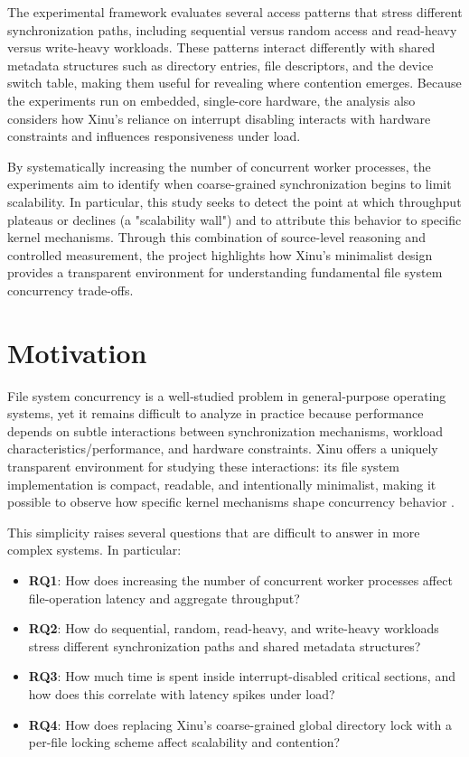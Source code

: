 \documentclass[sigconf]{acmart}
\begin{document}
The experimental framework evaluates several access patterns that stress different synchronization paths, including sequential versus random access and read-heavy versus write-heavy workloads. These patterns interact differently with shared metadata structures such as directory entries, file descriptors, and the device switch table, making them useful for revealing where contention emerges. Because the experiments run on embedded, single-core hardware, the analysis also considers how Xinu’s reliance on interrupt disabling interacts with hardware constraints and influences responsiveness under load.

By systematically increasing the number of concurrent worker processes, the experiments aim to identify when coarse-grained synchronization begins to limit scalability. In particular, this study seeks to detect the point at which throughput plateaus or declines (a "scalability wall")\cite{Sevilla2018TintenfischFS} and to attribute this behavior to specific kernel mechanisms. Through this combination of source-level reasoning and controlled measurement, the project highlights how Xinu’s minimalist design provides a transparent environment for understanding fundamental file system concurrency trade-offs.




\section{Motivation}
\label{sec:motive}

File system concurrency is a well‑studied problem in general‑purpose operating systems, yet it remains difficult to analyze in practice because performance depends on subtle interactions between synchronization mechanisms, workload characteristics/performance, and hardware constraints. Xinu offers a uniquely transparent environment for studying these interactions: its file system implementation is compact, readable, and intentionally minimalist, making it possible to observe how specific kernel mechanisms shape concurrency behavior \cite{Comer2018ALE, Beich2016OperatingSD}.

This simplicity raises several questions that are difficult to answer in more complex systems. In particular:
\begin{itemize}
    \item \textbf{RQ1}: How does increasing the number of concurrent worker processes affect file-operation latency and aggregate throughput?
    \item \textbf{RQ2}: How do sequential, random, read-heavy, and write-heavy workloads stress different
    synchronization paths and shared metadata structures?
    \item \textbf{RQ3}: How much time is spent inside interrupt-disabled critical sections, and how does this correlate with latency spikes under load?
    \item \textbf{RQ4}: How does replacing Xinu’s
    coarse-grained global directory lock with a per-file locking scheme affect scalability and contention?
\end{itemize}
\end{document}
